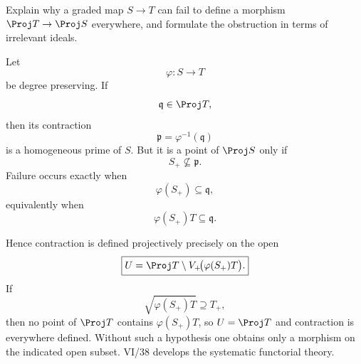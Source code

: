\begin{problem}\label{prob:vi35-12}
Explain why a graded map \(S\to T\) can fail to define a morphism \(\Proj T\to\Proj S\) everywhere, and formulate the obstruction in terms of irrelevant ideals.
\end{problem}

\ifdefined\FullProblemDossiers
\begin{solution}
Let
\[
\varphi:S\to T
\]
be degree preserving. If
\[
\mathfrak q\in\Proj T,
\]
then its contraction
\[
\mathfrak p=\varphi^{-1}(\mathfrak q)
\]
is a homogeneous prime of \(S\). But it is a point of \(\Proj S\) only if
\[
S_+\not\subseteq\mathfrak p.
\]
Failure occurs exactly when
\[
\varphi(S_+)\subseteq\mathfrak q,
\]
equivalently when
\[
\varphi(S_+)T\subseteq\mathfrak q.
\]

Hence contraction is defined projectively precisely on the open
\[
\boxed{
U
=
\Proj T\setminus V_+\!\bigl(\varphi(S_+)T\bigr).
}
\]
If
\[
\sqrt{\varphi(S_+)T}\supseteq T_+,
\]
then no point of \(\Proj T\) contains \(\varphi(S_+)T\), so \(U=\Proj T\) and contraction is everywhere defined.
Without such a hypothesis one obtains only a morphism on the indicated open subset. VI/38 develops the systematic
functorial theory.
\end{solution}
\fi
